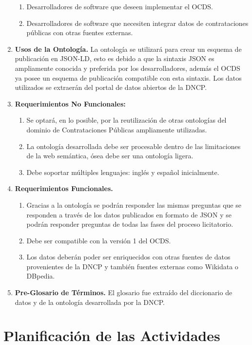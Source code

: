 \begin{enumerate}
\begin{enumerate}
    \item Desarrolladores de software que deseen implementar el OCDS.
    \item Desarrolladores de software que necesiten integrar datos de contrataciones públicas con otras fuentes externas. \end{enumerate}
\item \textbf{Usos de la Ontología. }La ontología se utilizará para crear un esquema de publicación en JSON-LD, esto es debido a que la sintaxis JSON es ampliamente conocida y preferida por los desarrolladores, además el OCDS ya posee un esquema de publicación compatible con esta sintaxis. Los datos utilizados se extraerán del portal de datos abiertos de la DNCP.
\item \textbf{Requerimientos No Funcionales: }
\begin{enumerate}
    \item Se optará, en lo posible, por la reutilización de otras ontologías del dominio de Contrataciones Públicas ampliamente utilizadas.
    \item La ontología desarrollada debe ser procesable dentro de las limitaciones de la web semántica, ósea debe ser una ontología ligera.
    \item Debe soportar múltiples lenguajes: inglés y español inicialmente.
\end{enumerate}
\item \textbf{Requerimientos Funcionales. }
    \begin{enumerate}
        \item Gracias a la ontología se podrán responder las mismas preguntas que se responden a través de los datos publicados en formato de JSON y se podrán responder preguntas de todas las fases del proceso licitatorio.
        \item Debe ser compatible con la versión 1 del OCDS.
        \item Los datos deberán poder ser enriquecidos con otras fuentes de datos provenientes de la DNCP y también fuentes externas como Wikidata o DBpedia.
    \end{enumerate}
\item \textbf{Pre-Glosario de Términos.} El glosario fue extraído del diccionario de datos y de la ontología desarrollada por la DNCP. 
\end{enumerate}

\section{Planificación de las Actividades}

